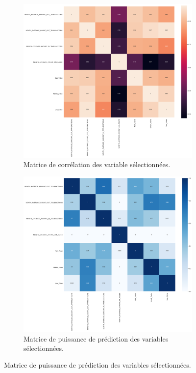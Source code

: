\begin{figure}[hbt!]
  \begin{subfigure}[t]{0.4\textwidth}
  \centering
  \includegraphics[width=\linewidth]{images_pfe/feature_correlations.png}
  \caption{Matrice de corrélation des variable sélectionnées.}
  \label{fig:chosen-features-correlations}
  \end{subfigure}\hfill
  \begin{subfigure}[t]{0.4\textwidth}
  \centering
  \includegraphics[width=\linewidth]{images_pfe/features_pps2.png}
  \caption{Matrice de puissance de prédiction des variables sélectionnées.}
  \label{fig:chosen-features-pps}
  \end{subfigure}
\end{figure}
\FloatBarrier


